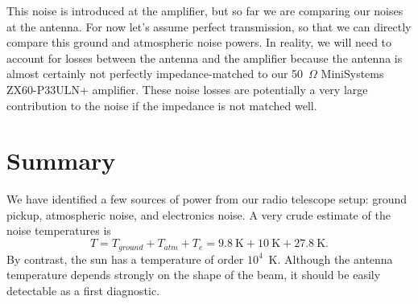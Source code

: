 \documentclass[11pt]{amsart}
\begin{document}
This noise is introduced at the amplifier, but so far we are comparing our noises at the antenna. For now let's assume perfect transmission, so that we can directly compare this ground and atmospheric noise powers. In reality, we will need to account for losses between the antenna and the amplifier because the antenna is almost certainly not perfectly impedance-matched to our 50~$\Omega$ MiniSystems ZX60-P33ULN+ amplifier. These noise losses are potentially a very large contribution to the noise if the impedance is not matched well.

\section{Summary}
We have identified a few sources of power from our radio telescope setup: ground pickup, atmospheric noise, and electronics noise. A very crude estimate of the noise temperatures is
\begin{equation}
T = T_{ground} + T_{atm} + T_{e} = 9.8~\textrm{K} + 10~\textrm{K} + 27.8~\textrm{K}.
\end{equation}
By contrast, the sun has a temperature of order $10^4$~K. Although the antenna temperature depends strongly on the shape of the beam, it should be easily detectable as a first diagnostic.
\end{document}
